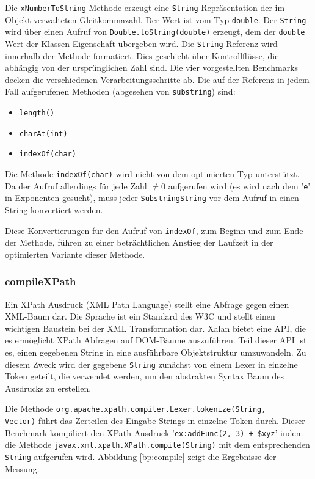 Die \texttt{xNumberToString} Methode erzeugt eine \texttt{String} Repräsentation der
im Objekt verwalteten Gleitkommazahl. Der Wert ist vom Typ \texttt{double}. Der 
\texttt{String} wird über einen Aufruf von \texttt{Double.toString(double)} erzeugt, dem der 
\texttt{double} Wert der Klassen Eigenschaft übergeben wird. Die \texttt{String} Referenz wird innerhalb der 
Methode formatiert. Dies geschieht über Kontrollflüsse, die abhängig von der ursprünglichen Zahl sind.
Die vier vorgestellten Benchmarks decken die verschiedenen Verarbeitungsschritte ab. Die auf der
Referenz in jedem Fall aufgerufenen Methoden (abgesehen von \texttt{substring}) sind:

\begin{itemize}
	\item \texttt{length()}
	\item \texttt{charAt(int)}
	\item \texttt{indexOf(char)}
\end{itemize}

Die Methode \texttt{indexOf(char)} wird nicht von dem optimierten Typ unterstützt.
Da der Aufruf allerdings für jede Zahl $\neq 0$ aufgerufen wird (es wird nach dem '\texttt{e}' in
Exponenten gesucht), muss jeder \texttt{SubstringString} vor dem Aufruf in einen String
konvertiert werden. 

Diese Konvertierungen für den Aufruf von \texttt{indexOf}, zum Beginn und zum Ende der Methode, 
führen zu einer beträchtlichen Anstieg der Laufzeit in der optimierten Variante dieser Methode.


\subsubsection{compileXPath}

Ein XPath Ausdruck (XML Path Language) stellt eine Abfrage gegen einen XML-Baum dar. Die Sprache
ist ein Standard des W3C und stellt einen wichtigen Baustein bei der XML Transformation dar.
Xalan bietet eine API, die es ermöglicht XPath Abfragen auf DOM-Bäume auszuführen. Teil dieser
API ist es, einen gegebenen String in eine ausführbare Objektstruktur umzuwandeln. Zu diesem Zweck
wird der gegebene \texttt{String} zunächst von einem Lexer in einzelne Token geteilt, die verwendet werden,
um den abstrakten Syntax Baum des Ausdrucks zu erstellen.

Die Methode \texttt{org.apache.xpath.compiler.Lexer.tokenize(String, \\Vector)} führt das Zerteilen 
des Eingabe-Strings in einzelne Token durch. Dieser Benchmark kompiliert den XPath Ausdruck
'\texttt{ex:addFunc(2, 3) + \$xyz}' indem die Methode \texttt{javax.xml.xpath.XPath.compile(String)}
mit dem entsprechenden \texttt{String} aufgerufen wird. Abbildung \ref{bp:compile} zeigt die Ergebnisse 
der Messung.

